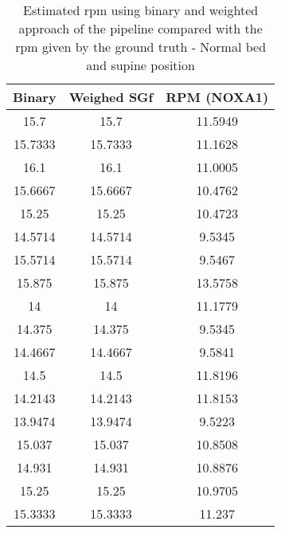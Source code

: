 \begin{table}[h]
    \centering
    \begin{tabular}{|c|c|c|}
    \hline 
    Binary & Weighed  SGf & RPM (NOXA1) \\ 
    \hline 
     15.7 & 15.7 & 11.5949 \\ 
    15.7333  & 15.7333 & 11.1628\\ 
   16.1  & 16.1 & 11.0005 \\ 
     15.6667 & 15.6667 & 10.4762  \\ 
  15.25  & 15.25 & 10.4723 \\ 
     14.5714 & 14.5714 & 9.5345  \\ 
     15.5714  & 15.5714 & 9.5467 \\ 
    15.875& 15.875 & 13.5758  \\ 
 14  & 14 & 11.1779  \\ 
     14.375  & 14.375 & 9.5345  \\ 
      14.4667  & 14.4667 & 9.5841 \\ 
 14.5  & 14.5 & 11.8196  \\ 
 14.2143 & 14.2143 & 11.8153  \\ 
 13.9474  & 13.9474 & 9.5223  \\ 
   15.037  & 15.037 & 10.8508  \\ 
 14.931  & 14.931 & 10.8876  \\ 
     15.25  & 15.25 & 10.9705  \\ 
     15.3333 & 15.3333 & 11.237  \\ 
    \hline 
    \end{tabular}
    
    \caption{Estimated rpm using binary and weighted approach of the pipeline
    compared with the rpm given by the ground truth - Normal bed and supine position}
    \label{tag:ProneNormalStill}
    \end{table}
    
    